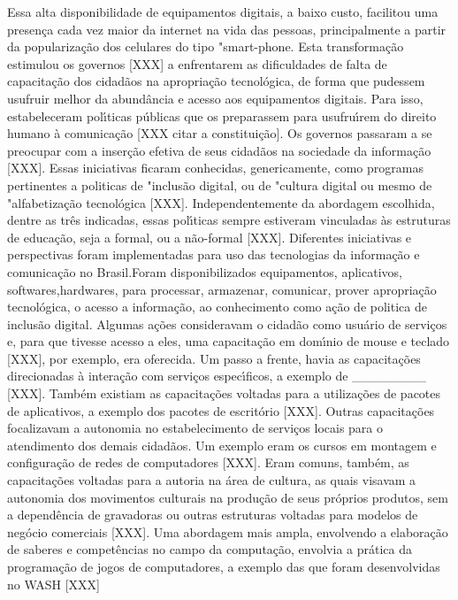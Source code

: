 \documentclass[
12pt,		%
openright,	%
twoside,  %
a4paper,			%
chapter=TITLE,		%
english,			%
french,				%
spanish,			%
brazil				%
]{USPSC-classe/USPSC}
\begin{document}
Essa alta disponibilidade de equipamentos digitais, a baixo custo, facilitou uma presen\c{c}a cada vez maior da internet na vida das pessoas, principalmente a partir da populariza\c{c}\~ao dos celulares do tipo "smart-phone.
Esta transforma\c{c}\~ao estimulou os governos [XXX] a enfrentarem as dificuldades  de falta de  capacita\c{c}\~ao dos cidad\~aos na apropria\c{c}\~ao tecnol\'ogica, de forma que pudessem usufruir melhor da abund\^ancia e acesso aos equipamentos digitais. Para isso, estabeleceram pol\'{\i}ticas p\'ublicas que os preparassem para usufru\'{\i}rem do direito humano \`a comunica\c{c}\~ao [XXX citar a constitui\c{c}\~ao]. Os governos passaram a se preocupar com a inser\c{c}\~ao efetiva de seus cidad\~aos na sociedade da informa\c{c}\~ao [XXX].
Essas iniciativas ficaram conhecidas, genericamente, como programas pertinentes a politicas de "inclus\~ao digital, ou  de "cultura digital ou mesmo de "alfabetiza\c{c}\~ao tecnol\'ogica [XXX]. Independentemente da abordagem escolhida, dentre as tr\^es indicadas, essas pol\'{\i}ticas sempre estiveram vinculadas \`as estruturas de educa\c{c}\~ao, seja a formal, ou a n\~ao-formal [XXX].
Diferentes iniciativas e perspectivas foram implementadas para uso das tecnologias da informa\c{c}\~ao e comunica\c{c}\~ao no Brasil.Foram disponibilizados equipamentos, aplicativos, softwares,hardwares, para processar, armazenar, comunicar, prover apropria\c{c}\~ao tecnol\'ogica, o acesso a  informa\c{c}\~ao, ao conhecimento como a\c{c}\~ao de politica de inclus\~ao digital.
Algumas a\c{c}\~oes consideravam o cidad\~ao como usu\'ario de servi\c{c}os e, para que tivesse acesso a eles, uma capacita\c{c}\~ao em dom\'{\i}nio de mouse e teclado [XXX], por exemplo, era oferecida.
Um passo a frente, havia as capacita\c{c}\~oes direcionadas \`a intera\c{c}\~ao com servi\c{c}os espec\'{\i}ficos, a exemplo de \_\_\_\_\_\_\_\_ [XXX].
Tamb\'em existiam as capacita\c{c}\~oes voltadas para a utiliza\c{c}\~oes de pacotes de aplicativos, a exemplo dos pacotes de escrit\'orio [XXX].
Outras capacita\c{c}\~oes focalizavam a autonomia no estabelecimento de servi\c{c}os locais para o atendimento dos demais cidad\~aos. Um exemplo eram os cursos em montagem e configura\c{c}\~ao de redes de computadores [XXX].
Eram comuns, tamb\'em, as capacita\c{c}\~oes voltadas para a autoria na \'area de cultura, as quais visavam a autonomia dos movimentos culturais na produ\c{c}\~ao de seus pr\'oprios produtos, sem a depend\^encia de gravadoras ou outras estruturas voltadas para modelos de neg\'ocio comerciais [XXX].
Uma abordagem mais ampla, envolvendo a elabora\c{c}\~ao de saberes e compet\^encias no campo da computa\c{c}\~ao, envolvia a pr\'atica da programa\c{c}\~ao de jogos de computadores, a exemplo das que foram desenvolvidas no WASH [XXX]
\end{document}
